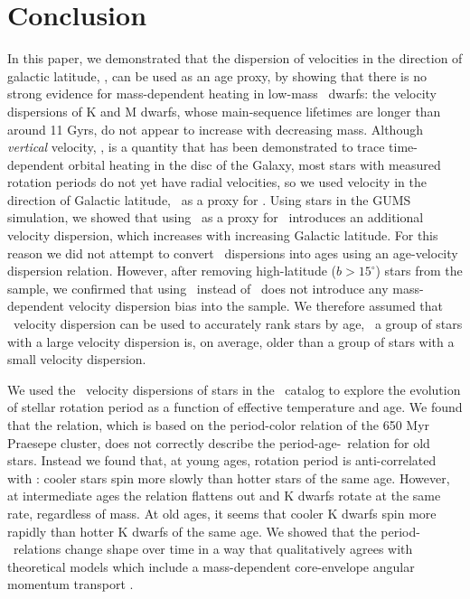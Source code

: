 \section{Conclusion}

In this paper, we demonstrated that the dispersion of velocities in the
direction of galactic latitude, \vb, can be used as an age proxy, by showing
that there is no strong evidence for mass-dependent heating in low-mass
\kepler\ dwarfs: the velocity dispersions of K and M dwarfs, whose
main-sequence lifetimes are longer than around 11 Gyrs, do not appear to
increase with decreasing mass.
Although {\it vertical} velocity, \vz, is a quantity that has been
demonstrated to trace time-dependent orbital heating in the disc of the
Galaxy, most stars with measured rotation periods do not yet have radial
velocities, so we used velocity in the direction of Galactic latitude, \vb\,
as a proxy for \vz.
Using stars in the GUMS simulation, we showed that using \vb\ as a proxy for
\vz\ introduces an additional velocity dispersion, which increases with
increasing Galactic latitude.
For this reason we did not attempt to convert \vb\ dispersions into ages using
an age-velocity dispersion relation.
However, after removing high-latitude ($b>15^\circ$) stars from the sample, we
confirmed that using \vb\ instead of \vz\ does not introduce any
mass-dependent velocity dispersion bias into the sample.
We therefore assumed that \vb\ velocity dispersion can be used to accurately
rank stars by age, \ie\ a group of stars with a large velocity dispersion is,
on average, older than a group of stars with a small velocity dispersion.

We used the \vb\ velocity dispersions of stars in the \mct\ catalog to explore
the evolution of stellar rotation period as a function of effective
temperature and age.
We found that the \citet{angus2019} relation, which is based on the
period-color relation of the 650 Myr Praesepe cluster, does not correctly
describe the period-age-\teff\ relation for old stars.
Instead we found that, at young ages, rotation period is anti-correlated with
\teff: cooler stars spin more slowly than hotter stars of the same age.
However, at intermediate ages the relation flattens out and K dwarfs rotate at
the same rate, regardless of mass.
At old ages, it seems that cooler K dwarfs spin more rapidly than hotter K
dwarfs of the same age.
We showed that the period-\teff\ relations change shape over time in a way
that qualitatively agrees with theoretical models which include a
mass-dependent core-envelope angular momentum transport \citep{spada2019}.

